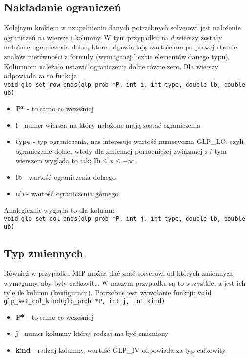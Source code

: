 \subsection{Nakładanie ograniczeń}
Kolejnym krokiem w uzupełnieniu danych potrzebnych solverowi jest nałożenie ograniczeń na  wiersze i kolumny. W tym przypadku na $d$ wierszy zostały nałożone  ograniczenia dolne, ktore odpowiadają wartościom po prawej stronie znaków nierówności z formuły (wymaganej liczbie elementów danego typu). Kolumnom należało ustawić ograniczenie dolne równe zero.
Dla wierszy odpowiada za to funkcja: \\
\verb|void glp_set_row_bnds(glp_prob *P, int i, int type, double lb, double ub)|
\begin{itemize}
	\item \textbf{P*} - to samo co wcześniej
	\item \textbf{i} - numer wiersza na który nałożone mają zostać ograniczenia
	\item \textbf{type} - typ ograniczenia, nas interesuje wartość numeryczna GLP\_LO, czyli ograniczenie dolne, wtedy dla zmiennej pomocniczej związanej z $i$-tym wierszem wygląda to tak: $\mathbf{lb} \leq x \le +\infty$
	\item \textbf{lb} - wartość ograniczenia dolnego
	\item \textbf{ub} - wartość ograniczenia górnego
\end{itemize}
Analogicznie wygląda to dla kolumn: \\
\verb|void glp set col bnds(glp prob *P, int j, int type, double lb, double ub)|

\subsection{Typ zmiennych}
Również w przypadku MIP można dać znać solverowi od których zmiennych wymagamy, aby były całkowite. W naszym przypadku są to wszystkie, a jest ich tyle ile kolumn (konfiguracji).
Potrzebne jest wywołanie funkcji:
\verb|void glp_set_col_kind(glp_prob *P, int j, int kind)|

\begin{itemize}
	\item \textbf{P*} - to samo co wcześniej
	\item \textbf{j} - numer kolumny której rodzaj ma być zmieniony
	\item \textbf{kind} - rodzaj kolumny, wartość GLP\_IV odpowiada za typ całkowity
\end{itemize}

